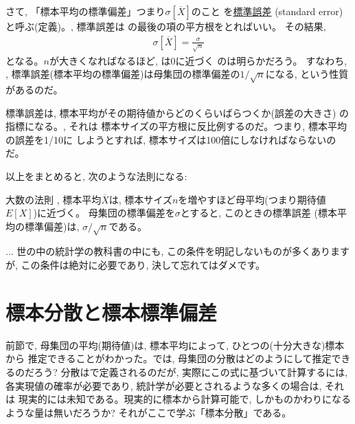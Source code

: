 さて, 「標本平均の標準偏差」つまり$\sigma[\overline{X}]$のこと
を\underline{標準誤差} (standard error)
と呼ぶ(定義)。, 標準誤差は
の最後の項の平方根をとればいい。
その結果, 
\begin{eqnarray}
\sigma[\overline{X}]=\frac{\sigma}{\sqrt{n}}\label{eq:sigma_averageX}
\end{eqnarray}
となる。$n$が大きくなればなるほど, は0に近づく
のは明らかだろう。
すなわち, , 
標準誤差(標本平均の標準偏差)は母集団の標準偏差の$1/\sqrt{n}$になる, 
という性質があるのだ。

標準誤差は, 標本平均がその期待値からどのくらいばらつくか(誤差の大きさ)
の指標になる。, それは
標本サイズの平方根に反比例するのだ。つまり, 標本平均の誤差を1/10に
しようとすれば, 標本サイズは100倍にしなければならないのだ。

以上をまとめると, 次のような法則になる:
\begin{itembox}{大数の法則}
, 標本平均$\overline{X}$は, 
標本サイズ$n$を増やすほど母平均(つまり期待値$E[X]$)に近づく。
母集団の標準偏差を$\sigma$とすると, このときの標準誤差
(標本平均の標準偏差)は, $\sigma/\sqrt{n}$である。
\end{itembox}

\begin{freqmiss}{\small{} ... 世の中の統計学の教科書の中にも, 
この条件を明記しないものが多くありますが, この条件は絶対に必要であり, 
決して忘れてはダメです。}\end{freqmiss}

\section{標本分散と標本標準偏差}

前節で, 母集団の平均(期待値)は, 標本平均によって, ひとつの(十分大きな)標本から
推定できることがわかった。では, 母集団の分散はどのようにして推定できるのだろう? 
分散はで定義されるのだが, 実際にこの式に基づいて計算するには, 
各実現値の確率が必要であり, 統計学が必要とされるような多くの場合は, それは
現実的には未知である。現実的に標本から計算可能で, しかものかわりになる
ような量は無いだろうか? それがここで学ぶ「標本分散」である。

